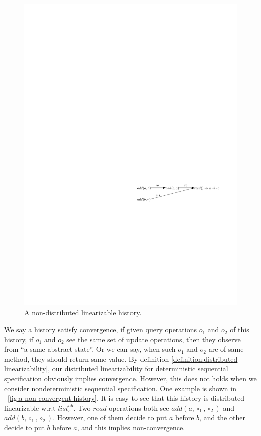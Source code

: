 {\begin{figure}[t]
  \centering
  \includegraphics[width=0.6 \textwidth]{figures/PIC-Example-NonLinHis.pdf}
  \caption{A non-distributed linearizable history.}
  \label{fig:a non-distributed linearizable history}
\end{figure}

We say a history satisfy convergence, if given query operations $o_1$ and $o_2$ of this history, if $o_1$ and $o_2$ see the same set of update operations, then they observe from ``a same abstract state''. Or we can say, when such $o_1$ and $o_2$ are of same method, they should return same value. By definition \ref{definition:distributed linearizability}, our distributed linearizability for deterministic sequential specification obviously implies convergence. However, this does not holds when we consider nondeterministic sequential specification. One example is shown in \figurename~\ref{fig:a non-convergent history}. It is easy to see that this history is distributed linearizable w.r.t $\mathit{list}_s^{\mathit{ab}}$. Two $\mathit{read}$ operations both see $\mathit{add}(a,\circ_1,\circ_2)$ and $\mathit{add}(b,\circ_1,\circ_2)$. However, one of them decide to put $a$ before $b$, and the other decide to put $b$ before $a$, and this implies non-convergence.


}
